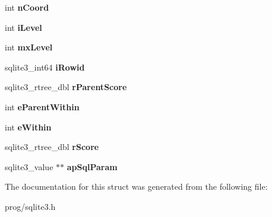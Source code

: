 \begin{DoxyCompactItemize}
int {\bfseries n\+Coord}
\item 
\mbox{\label{structsqlite3__rtree__query__info_af91ca2d5f867b3b0aa9c91920a3b5b45}} 
int {\bfseries i\+Level}
\item 
\mbox{\label{structsqlite3__rtree__query__info_ac84533734fb4c86c3f2deba904118785}} 
int {\bfseries mx\+Level}
\item 
\mbox{\label{structsqlite3__rtree__query__info_a9e43489993c8aeace851f86eaa00ec26}} 
sqlite3\+\_\+int64 {\bfseries i\+Rowid}
\item 
\mbox{\label{structsqlite3__rtree__query__info_af7da93e7fc405eec7e7ec90ab237eab2}} 
sqlite3\+\_\+rtree\+\_\+dbl {\bfseries r\+Parent\+Score}
\item 
\mbox{\label{structsqlite3__rtree__query__info_a8bd37c6af5427c35830f674a4db682c3}} 
int {\bfseries e\+Parent\+Within}
\item 
\mbox{\label{structsqlite3__rtree__query__info_ad1038309f7ea55472a7ff99bf4f9d514}} 
int {\bfseries e\+Within}
\item 
\mbox{\label{structsqlite3__rtree__query__info_af449e4a3607573d17b3d31c67b6e1584}} 
sqlite3\+\_\+rtree\+\_\+dbl {\bfseries r\+Score}
\item 
\mbox{\label{structsqlite3__rtree__query__info_a57ccb3cce45dd946e5184b5addeb0326}} 
sqlite3\+\_\+value $\ast$$\ast$ {\bfseries ap\+Sql\+Param}
\end{DoxyCompactItemize}


The documentation for this struct was generated from the following file\+:\begin{DoxyCompactItemize}
\item 
prog/sqlite3.\+h\end{DoxyCompactItemize}
